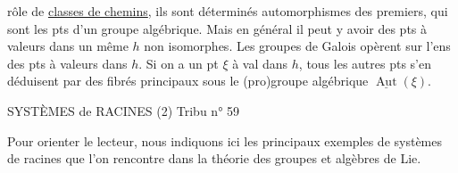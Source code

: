 rôle de \uline{classes de chemins}, ils sont déterminés   automorphismes des premiers, qui sont les pts d'un groupe algébrique. Mais en général il peut y avoir des pts à valeurs dans un même $h$ non isomorphes. Les groupes de Galois opèrent sur  l'ens des pts à valeurs dans $h$. Si on a un pt $\xi$ à val dans $h$, tous les autres pts s'en déduisent par des fibrés principaux  sous le (pro)groupe algébrique $\underline{\operatorname{Aut}}(\xi)$.


SYSTÈMES de RACINES (2) \hfill Tribu n° 59

Pour orienter le lecteur, nous indiquons ici les principaux exemples de
systèmes de racines que l'on rencontre dans la théorie des groupes et algèbres
de Lie.

